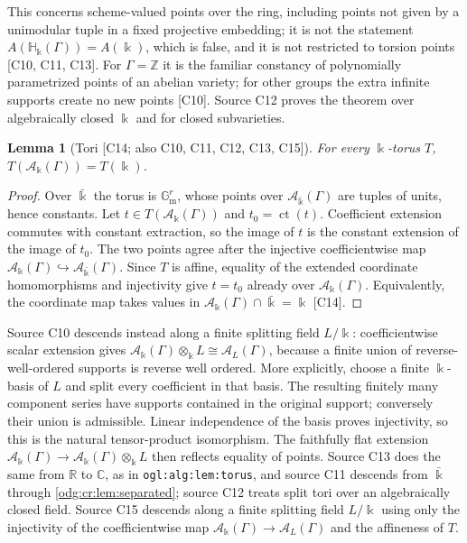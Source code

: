 \documentclass[11pt,oneside]{article}
\numberwithin{equation}{section}
\newtheorem{lemma}[lemma]{Lemma}
\theoremstyle{definition}
\theoremstyle{remark}
\newcommand{\Z}{\mathbb Z}
\newcommand{\R}{\mathbb R}
\newcommand{\C}{\mathbb C}
\newcommand{\ct}{\operatorname{ct}}
\newcommand{\src}[1]{\textup{\textsf{\small[#1]}}}
\newcommand{\replabel}[1]{\nolinkurl{#1}}
\newcommand{\crH}{\mathbb H_\Bbbk(\Gamma)}
\newcommand{\crA}{\mathcal A_\Bbbk(\Gamma)}
\newcommand{\Gm}{\mathbb G_{\mathrm m}}
\begin{document}
This concerns scheme-valued points over the ring, including points not given by a
unimodular tuple in a fixed projective embedding; it is not the statement
$A(\crH)=A(\Bbbk)$, which is false, and it is not restricted to torsion points
\src{C10, C11, C13}. For $\Gamma=\Z$ it is the familiar constancy of polynomially
parametrized points of an abelian variety; for other groups the extra infinite
supports create no new points \src{C10}. Source C12 proves the theorem over
algebraically closed $\Bbbk$ and for closed subvarieties.

\begin{lemma}[Tori \src{C14; also C10, C11, C12, C13, C15}]\label{odg:cr:lem:torus}
For every $\Bbbk$-torus $T$, $T(\crA)=T(\Bbbk)$.
\end{lemma}
\begin{proof}
Over $\bar\Bbbk$ the torus is $\Gm^r$, whose points over
$\mathcal A_{\bar\Bbbk}(\Gamma)$ are tuples of units, hence constants.
Let $t\in T(\crA)$ and $t_0=\ct(t)$. Coefficient extension commutes with
constant extraction, so the image of $t$ is the constant extension of the
image of $t_0$. The two points agree after the injective coefficientwise
map $\crA\hookrightarrow\mathcal A_{\bar\Bbbk}(\Gamma)$.
Since $T$ is affine, equality of the extended coordinate homomorphisms
and injectivity give $t=t_0$ already over $\crA$. Equivalently, the
coordinate map takes values in $\crA\cap\bar\Bbbk=\Bbbk$ \src{C14}.
\end{proof}

Source C10 descends instead along a finite splitting field $L/\Bbbk$: coefficientwise
scalar extension gives $\crA\otimes_\Bbbk L\cong\mathcal A_L(\Gamma)$, because a finite
union of reverse-well-ordered supports is reverse well ordered. More explicitly,
choose a finite $\Bbbk$-basis of $L$ and split every coefficient in that
basis. The resulting finitely many component series have supports contained
in the original support; conversely their union is admissible. Linear
independence of the basis proves injectivity, so this is the natural
tensor-product isomorphism. The faithfully flat extension
$\crA\to\crA\otimes_\Bbbk L$ then reflects equality of points. Source C13
does the same from $\R$ to $\C$, as in \replabel{ogl:alg:lem:torus}, and source C11
descends from $\bar\Bbbk$ through \cref{odg:cr:lem:separated}; source C12 treats split
tori over an algebraically closed field. Source C15 descends along a finite splitting
field $L/\Bbbk$ using only the injectivity of the coefficientwise map
$\crA\to\mathcal A_L(\Gamma)$ and the affineness of $T$.
\end{document}

